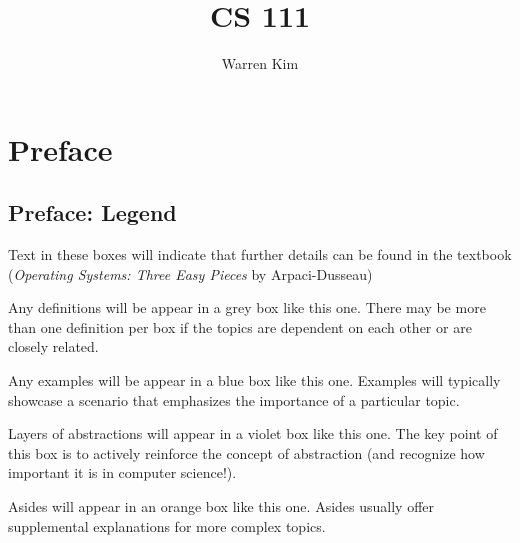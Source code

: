 \documentclass{report}
\title{CS 111}
\author{Warren Kim}
\date{}
\begin{document}
\maketitle

\tableofcontents
\newpage

\part*{Preface}










\chapter*{Preface: Legend}
\begin{tcolorbox}[colback=black!5!white,colframe=black!75!black,title=\textit{Operating Systems, Three Easy Pieces}]
  Text in these boxes will indicate that further details can be found in the textbook
  (\textit{Operating Systems: Three Easy Pieces} by Arpaci-Dusseau)
\end{tcolorbox}

\begin{tcolorbox}[title=Definitions]
  Any definitions will be appear in a grey box like this one. There may be more than one definition
  per box if the topics are dependent on each other or are closely related.
\end{tcolorbox}

\begin{tcolorbox}[colback=blue!5!white,colframe=black!75!blue,title=Examples]
  Any examples will be appear in a blue box like this one. Examples will typically showcase a scenario
  that emphasizes the importance of a particular topic.
\end{tcolorbox}

\begin{tcolorbox}[colback=violet!5!white,colframe=violet,title=Abstractions] 
  Layers of abstractions will appear in a violet box like this one. The key point of this box is to
  actively reinforce the concept of abstraction (and recognize how important it is in computer science!).
\end{tcolorbox}

\begin{tcolorbox}[colback=orange!5!white,colframe=black!75!orange,title=Asides]
  Asides will appear in an orange box like this one. Asides usually offer supplemental explanations
  for more complex topics.
\end{tcolorbox}
\end{document}
